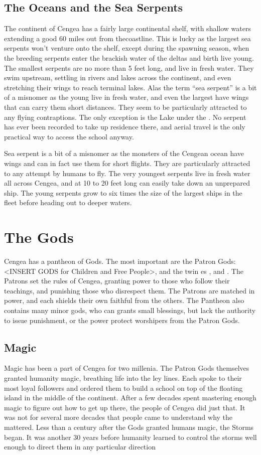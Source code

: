 \documentclass[blue]{GL2020}
\begin{document}
\subsection*{The Oceans and the Sea Serpents}
The continent of Cengea has a fairly large continental shelf, with shallow waters extending a good 60 miles out from thecoastline. This is lucky as the largest sea serpents won't venture onto the shelf, except during the spawning season, when the breeding serpents enter the brackish water of the deltas and birth live young. The smallest serpents are no more than 5 feet long, and live in fresh water. They swim upstream, settling in rivers and lakes across the continent, and even stretching their wings to reach terminal lakes. Alas the term ``sea serpent'' is a bit of a misnomer as the young live in fresh water, and even the largest have wings that can carry them short distances. They seem to be particularly attracted to any flying contraptions. The only exception is the Lake under the \pSchool{}. No serpent has ever been recorded to take up residence there, and aerial travel is the only practical way to access the school anyway.

Sea serpent is a bit of a misnomer as the monsters of the Cengean ocean have wings and can in fact use them for short flights. They are particularly attracted to any attempt by humans to fly. The very youngest serpents live in fresh water all across Cengea, and at 10 to 20 feet long can easily take down an unprepared ship. The young serpents grow to six times the size of the largest ships in the \pShip{} fleet before heading out to deeper waters.

\section*{The Gods}
Cengea has a pantheon of Gods. The most important are the Patron Gods: <INSERT GODS for Children and Free People>, and the twin \cEbb{\God}es \cEbbFull{}, and \cFlowFull{}. The Patrons set the rules of Cengea, granting power to those who follow their teachings, and punishing those who disrespect them. The Patrons are matched in power, and each shields their own faithful from the others. The Pantheon also contains many minor gods, who can grants small blessings, but lack the authority to issue punishment, or the power protect worshipers from the Patron Gods.

\subsection*{Magic}
Magic has been a part of Cengea for two millenia. The Patron Gods themselves granted humanity magic, breathing life into the ley lines. Each spoke to their most loyal followers and ordered them to build a school on top of the floating island in the middle of the continent. After a few decades spent mastering enough magic to figure out how to get up there, the people of Cengea did just that. It was not for several more decades that people came to understand why the \pSc{} mattered. Less than a century after the Gods granted humans magic, the Storms began. It was another 30 years before humanity learned to control the storms well enough to direct them in any particular direction
\end{document}
